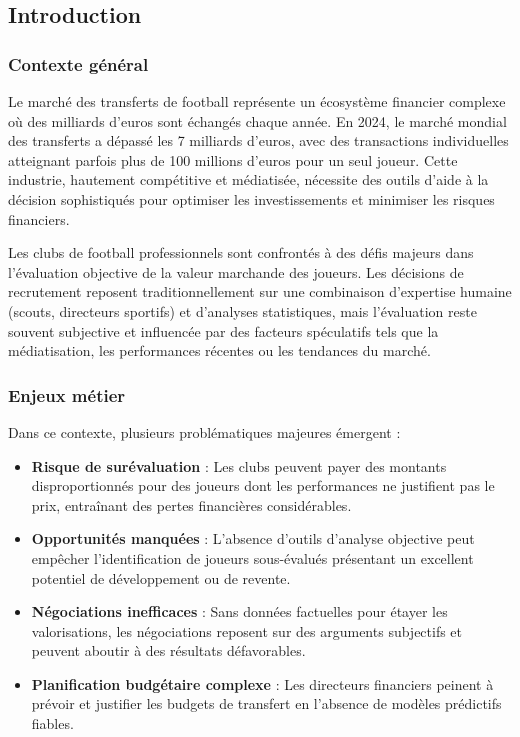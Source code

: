 \documentclass[12pt,a4paper]{article}
\begin{document}
\subsection{Introduction}

\subsubsection{Contexte général}

Le marché des transferts de football représente un écosystème financier complexe où des milliards d'euros sont échangés chaque année. En 2024, le marché mondial des transferts a dépassé les 7 milliards d'euros, avec des transactions individuelles atteignant parfois plus de 100 millions d'euros pour un seul joueur. Cette industrie, hautement compétitive et médiatisée, nécessite des outils d'aide à la décision sophistiqués pour optimiser les investissements et minimiser les risques financiers.

Les clubs de football professionnels sont confrontés à des défis majeurs dans l'évaluation objective de la valeur marchande des joueurs. Les décisions de recrutement reposent traditionnellement sur une combinaison d'expertise humaine (scouts, directeurs sportifs) et d'analyses statistiques, mais l'évaluation reste souvent subjective et influencée par des facteurs spéculatifs tels que la médiatisation, les performances récentes ou les tendances du marché.

\subsubsection{Enjeux métier}

Dans ce contexte, plusieurs problématiques majeures émergent :

\begin{itemize}[leftmargin=*]
    \item \textbf{Risque de surévaluation} : Les clubs peuvent payer des montants disproportionnés pour des joueurs dont les performances ne justifient pas le prix, entraînant des pertes financières considérables.
    
    \item \textbf{Opportunités manquées} : L'absence d'outils d'analyse objective peut empêcher l'identification de joueurs sous-évalués présentant un excellent potentiel de développement ou de revente.
    
    \item \textbf{Négociations inefficaces} : Sans données factuelles pour étayer les valorisations, les négociations reposent sur des arguments subjectifs et peuvent aboutir à des résultats défavorables.
    
    \item \textbf{Planification budgétaire complexe} : Les directeurs financiers peinent à prévoir et justifier les budgets de transfert en l'absence de modèles prédictifs fiables.
\end{itemize}
\end{document}
